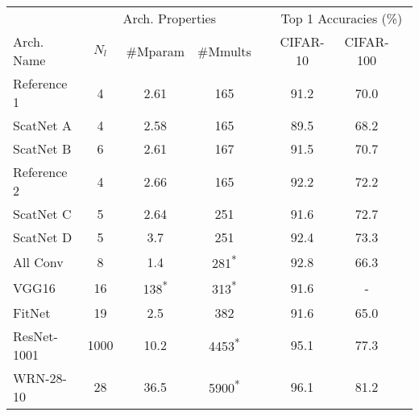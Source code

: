 \begin{table}
  \renewcommand{\arraystretch}{1.2}
  \centering
  \label{tab:ch5:hybrid_scat}
  \begin{tabular}{@{}lccccccc@{}}
    \toprule
    & \multicolumn{3}{c}{Arch. Properties} && \multicolumn{3}{c}{Top 1 Accuracies (\%)} \\\cline{2-4}\cline{6-7}
    Arch. Name \phantom{abcde} & $N_l$ &\#Mparam &\#Mmults&\phantom{ab}&CIFAR-10&CIFAR-100\\ \midrule
    Reference 1 & 4 & 2.61 & 165 && 91.2 & 70.0 \\ 
    ScatNet A & 4 & 2.58 & 165 && 89.5 & 68.2 \\ 
    ScatNet B & 6 & 2.61 & 167 && 91.5 & 70.7  \\\midrule %
    Reference 2 & 4 & 2.66 & 165 && 92.2 & 72.2  \\ 
    ScatNet C & 5 & 2.64 & 251 && 91.6 & 72.7  \\ 
    ScatNet D & 5 & 3.7 & 251 && 92.4 & 73.3 \\ \midrule 
    All Conv\cite{springenberg_striving_2014-3} & 8 & 1.4 & 281\textsuperscript{*} && 92.8 & 66.3 \\ %
    VGG16\cite{liu_very_2015} & 16 & 138\textsuperscript{*} & 313\textsuperscript{*}  && 91.6 & -  \\ 
    FitNet\cite{romero_fitnets:_2014} & 19 & 2.5 & 382 && 91.6 & 65.0 \\ %
    ResNet-1001\cite{he_identity_2016} & 1000 & 10.2 & 4453\textsuperscript{*}&& 95.1 & 77.3 \\ %
    WRN-28-10\cite{zagoruyko_wide_2016} & 28 & 36.5 & 5900\textsuperscript{*} && 96.1 & 81.2 \\ %

\end{tabular}
\end{table}
